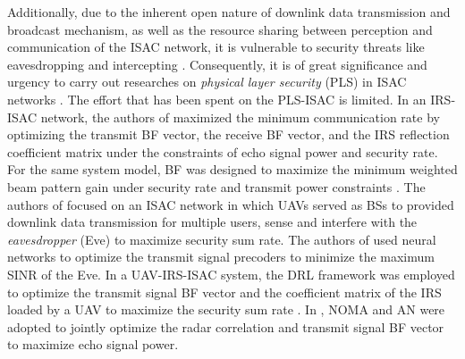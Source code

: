 Additionally, due to the inherent open nature of downlink data transmission and broadcast mechanism, as well as the resource sharing between perception and communication of the ISAC network, it is vulnerable to security threats like eavesdropping and intercepting \cite{Intro_PLS_ISAC}. Consequently, it is of great significance and urgency to carry out researches on \emph{physical layer security} (PLS) in ISAC networks \cite{ISAC_PLS_50}. The effort that has been spent on the PLS-ISAC is limited. In an IRS-ISAC network, the authors of \cite{ISAC_PLS_27} maximized the minimum communication rate by optimizing the transmit BF vector, the receive BF vector, and the IRS reflection coefficient matrix under the constraints of echo signal power and security rate. For the same system model, BF was designed to maximize the minimum weighted beam pattern gain under security rate and transmit power constraints \cite{ISAC_PLS_33}. 
The authors of \cite{ISAC_PLS_28} focused on an ISAC network in which UAVs served as BSs to provided downlink data transmission for multiple users, sense and interfere with the \emph{eavesdropper} (Eve) to maximize security sum rate. 
The authors of \cite{ISAC_PLS_32} used neural networks to optimize the transmit signal precoders to minimize the maximum SINR of the Eve. In a UAV-IRS-ISAC system, the DRL framework was employed to optimize the transmit signal BF vector and the coefficient matrix of the IRS loaded by a UAV to maximize the security sum rate \cite{ISAC_PLS_34}. In \cite{ISAC_PLS_35}, NOMA and AN were adopted to jointly optimize the radar correlation and transmit signal BF vector to maximize echo signal power. %

%